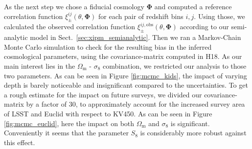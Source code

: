 \documentclass[referee]{aa} %
\renewcommand{\[}{\begin{equation}}
\renewcommand{\]}{\end{equation}}
\renewcommand{\rm}{\mathrm}
\def\b#1{\bm{#1}}
\begin{document}
As the next step we chose a fiducial cosmology $\b \Phi$ and computed a reference correlation function $\xi_\pm^{ij}(\theta,\b\Phi)$ for each pair of redshift bins $i,j$. Using those, we calculated the observed correlation function $\xi_\pm^{ij,\rm{obs}}(\theta,\b\Phi)$ according to our semi-analytic model in Sect.~\ref{sec:xipm_semianalytic}. Then we ran a Markov-Chain Monte Carlo simulation to check for the resulting bias in the inferred cosmological parameters, using the covariance-matrix computed in H18. As our main interest lies in the $\Omega_{\rm m}$ - $\sigma_8$ combination, we restricted our analysis to those two parameters. As can be seen in Figure \ref{fig:mcmc_kids}, the impact of varying depth is barely noticeable and insignificant compared to the uncertainties. To get a rough estimate for the impact on future surveys, we divided our covariance-matrix by a factor of 30, to approximately account for the increased survey area of LSST and Euclid with respect to KV450. As can be seen in Figure \ref{fig:mcmc_euclid}, here the impact on both $\Omega_{\rm m}$ and $\sigma_8$ is significant. Conveniently it seems that the parameter $S_8$ is considerably more robust against this effect.
\end{document}
